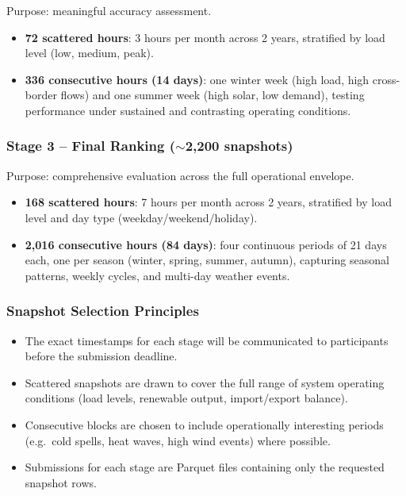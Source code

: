 \documentclass[11pt,a4paper]{article}
\begin{document}
Purpose: meaningful accuracy assessment.

\begin{itemize}[nosep]
  \item \textbf{72 scattered hours}: 3 hours per month across 2 years, stratified by load level (low, medium, peak).
  \item \textbf{336 consecutive hours (14 days)}: one winter week (high load, high cross-border flows) and one summer week (high solar, low demand), testing performance under sustained and contrasting operating conditions.
\end{itemize}

\subsubsection{Stage 3 -- Final Ranking ($\sim$2,200 snapshots)}

Purpose: comprehensive evaluation across the full operational envelope.

\begin{itemize}[nosep]
  \item \textbf{168 scattered hours}: 7 hours per month across 2 years, stratified by load level and day type (weekday/weekend/holiday).
  \item \textbf{2,016 consecutive hours (84 days)}: four continuous periods of 21 days each, one per season (winter, spring, summer, autumn), capturing seasonal patterns, weekly cycles, and multi-day weather events.
\end{itemize}

\subsubsection{Snapshot Selection Principles}

\begin{itemize}[nosep]
  \item The exact timestamps for each stage will be communicated to participants before the submission deadline.
  \item Scattered snapshots are drawn to cover the full range of system operating conditions (load levels, renewable output, import/export balance).
  \item Consecutive blocks are chosen to include operationally interesting periods (e.g.\ cold spells, heat waves, high wind events) where possible.
  \item Submissions for each stage are Parquet files containing only the requested snapshot rows.
\end{itemize}
\end{document}
